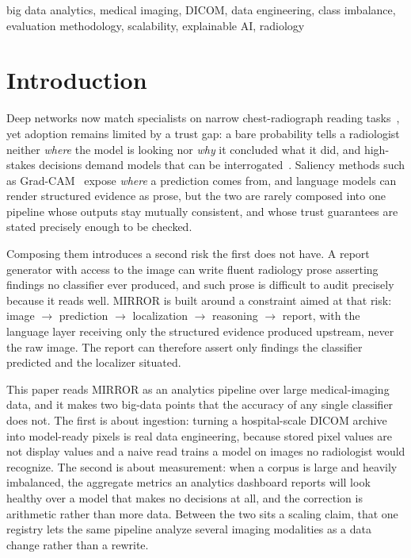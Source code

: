 \documentclass[conference]{IEEEtran}
\begin{document}
\begin{IEEEkeywords}
big data analytics, medical imaging, DICOM, data engineering, class imbalance,
evaluation methodology, scalability, explainable AI, radiology
\end{IEEEkeywords}

\section{Introduction}

Deep networks now match specialists on narrow chest-radiograph reading
tasks~\cite{rajpurkar2017chexnet}, yet adoption remains limited by a trust gap: a
bare probability tells a radiologist neither \emph{where} the model is looking nor
\emph{why} it concluded what it did, and high-stakes decisions demand models that
can be interrogated~\cite{rudin2019stop}. Saliency methods such as
Grad-CAM~\cite{selvaraju2017gradcam} expose \emph{where} a prediction comes from,
and language models can render structured evidence as prose, but the two are rarely
composed into one pipeline whose outputs stay mutually consistent, and whose trust
guarantees are stated precisely enough to be checked.

Composing them introduces a second risk the first does not have. A report
generator with access to the image can write fluent radiology prose asserting
findings no classifier ever produced, and such prose is difficult to audit
precisely because it reads well. MIRROR is built around a constraint aimed at that
risk: image $\rightarrow$ prediction $\rightarrow$ localization $\rightarrow$
reasoning $\rightarrow$ report, with the language layer receiving only the
structured evidence produced upstream, never the raw image. The report can
therefore assert only findings the classifier predicted and the localizer situated.

This paper reads MIRROR as an analytics pipeline over large medical-imaging data,
and it makes two big-data points that the accuracy of any single classifier does
not. The first is about ingestion: turning a hospital-scale DICOM archive into
model-ready pixels is real data engineering, because stored pixel values are not
display values and a naive read trains a model on images no radiologist would
recognize. The second is about measurement: when a corpus is large and heavily
imbalanced, the aggregate metrics an analytics dashboard reports will look healthy
over a model that makes no decisions at all, and the correction is arithmetic rather
than more data. Between the two sits a scaling claim, that one registry lets the
same pipeline analyze several imaging modalities as a data change rather than a
rewrite.
\end{document}
